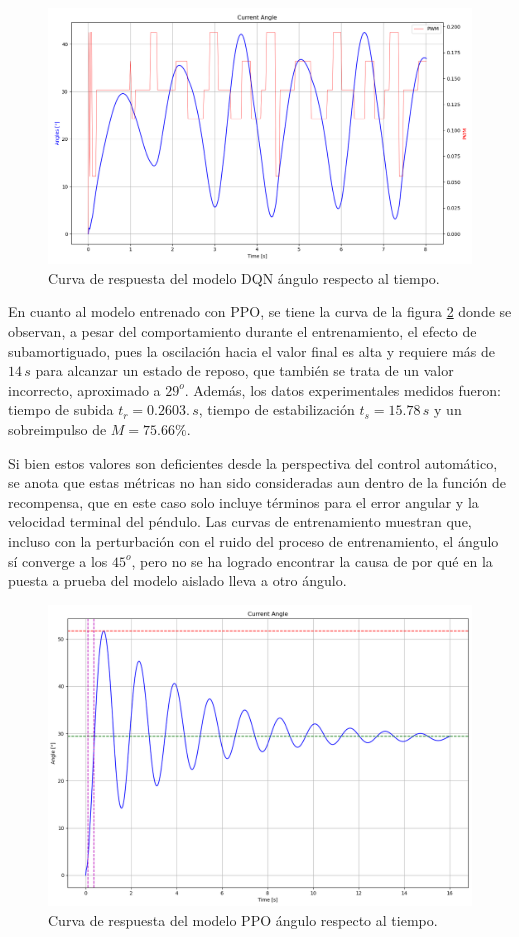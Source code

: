 \begin{figure}[hh]
	\centering
	\includegraphics[scale=0.4]{fig/new/DQNprueba.png}
	\caption{Curva de respuesta del modelo DQN ángulo respecto al tiempo.}
	\label{fig:DQNfinal}
\end{figure}


En cuanto al modelo entrenado con PPO, se tiene la curva de la figura \ref{fig:PPOfinal} donde se observan, a pesar del comportamiento durante el entrenamiento, el efecto de subamortiguado, pues la oscilación hacia el valor final es alta y requiere más de $14\, s$ para alcanzar un estado de reposo, que también se trata de un valor incorrecto, aproximado a $29^o$. Además, los datos experimentales medidos fueron: tiempo de subida $t_r = 0.2603. \, s$, tiempo de estabilización $t_s = 15.78\, s$ y un sobreimpulso de $M = 75.66\%$.

Si bien estos valores son deficientes desde la perspectiva del control automático, se anota que estas métricas no han sido consideradas aun dentro de la función de recompensa, que en este caso solo incluye términos para el error angular y la velocidad terminal del péndulo. Las curvas de entrenamiento muestran que, incluso con la perturbación con el ruido del proceso de entrenamiento, el ángulo sí converge a los $45^o$, pero no se ha logrado encontrar la causa de por qué en la puesta a prueba del modelo aislado lleva a otro ángulo.


\begin{figure}[hh]
	\centering
	\includegraphics[scale=0.4]{fig/new/PPOprueba.png}
	\caption{Curva de respuesta del modelo PPO ángulo respecto al tiempo.}
	\label{fig:PPOfinal}
\end{figure}



